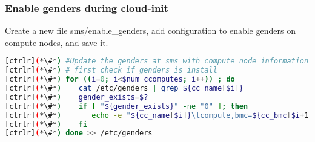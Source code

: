  \subsubsection{Enable genders during cloud-init}
	
	Create a new file sms/enable\_genders, add configuration to enable genders on compute nodes, and save it. 

 
 
 \begin{lstlisting}[language=bash,keywords={}]
[ctrlr](*\#*) #Update the genders at sms with compute node information
[ctrlr](*\#*) # first check if genders is install 
[ctrlr](*\#*) for ((i=0; i<$num_ccomputes; i++)) ; do
[ctrlr](*\#*)    cat /etc/genders | grep ${cc_name[$i]}
[ctrlr](*\#*)    gender_exists=$?
[ctrlr](*\#*)    if [ "${gender_exists}" -ne "0" ]; then 
[ctrlr](*\#*)       echo -e "${cc_name[$i]}\tcompute,bmc=${cc_bmc[$i+1]}"
[ctrlr](*\#*)    fi
[ctrlr](*\#*) done >> /etc/genders
 \end{lstlisting}
 
